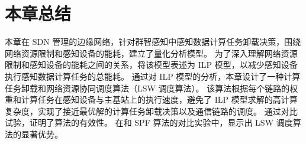 
\section{本章总结}

本章在 SDN 管理的边缘网络，针对群智感知中感知数据计算任务卸载决策，围绕网络资源限制和感知设备的能耗，建立了量化分析模型。
为了深入理解网络资源限制和感知设备的能耗之间的关系，将该模型表述为 ILP 模型，以减少感知设备执行感知数据计算任务的总能耗。
通过对 ILP 模型的分析，本章设计了一种计算任务卸载和网络资源协同调度算法（LSW 调度算法）。
该算法根据每个链路的权重和计算任务在感知设备与主基站上的执行速度，避免了 ILP 模型求解的高计算复杂度，实现了接近最优解的计算任务卸载决策以及通信链路的调度。
通过对比试验，证明了算法的有效性。
在和 SPF 算法的对比实验中，显示出 LSW 调度算法的显著优势。



